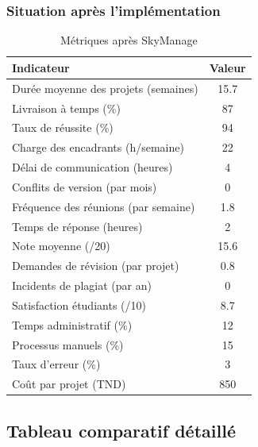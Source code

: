 \subsubsection{Situation après l'implémentation}
\begin{table}[h!]
\centering
\caption{Métriques après SkyManage}
\label{tab:after-metrics}
\begin{tabular}{|l|c|}
\hline
\textbf{Indicateur} & \textbf{Valeur} \\
\hline
Durée moyenne des projets (semaines) & 15.7 \\
\hline
Livraison à temps (\%) & 87 \\
\hline
Taux de réussite (\%) & 94 \\
\hline
Charge des encadrants (h/semaine) & 22 \\
\hline
Délai de communication (heures) & 4 \\
\hline
Conflits de version (par mois) & 0 \\
\hline
Fréquence des réunions (par semaine) & 1.8 \\
\hline
Temps de réponse (heures) & 2 \\
\hline
Note moyenne (/20) & 15.6 \\
\hline
Demandes de révision (par projet) & 0.8 \\
\hline
Incidents de plagiat (par an) & 0 \\
\hline
Satisfaction étudiants (/10) & 8.7 \\
\hline
Temps administratif (\%) & 12 \\
\hline
Processus manuels (\%) & 15 \\
\hline
Taux d'erreur (\%) & 3 \\
\hline
Coût par projet (TND) & 850 \\
\hline
\end{tabular}
\end{table}

\subsection{Tableau comparatif détaillé}

